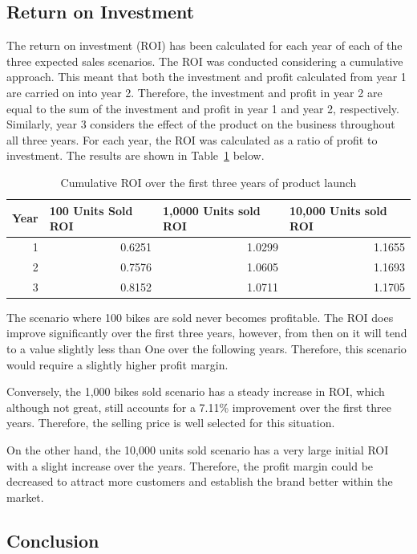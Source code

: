 \documentclass[a4paper,11pt]{article}
\begin{document}
\subsection{Return on Investment}
\label{sec:roi}

The return on investment (ROI) has been calculated for each year of each of the three expected sales scenarios. The ROI was conducted considering a cumulative approach. This meant that both the investment and profit calculated from year 1 are carried on into year 2. Therefore, the investment and profit in year 2 are equal to the sum of the investment and profit in year 1 and year 2, respectively. Similarly, year 3 considers the effect of the product on the business throughout all three years. For each year, the ROI was calculated as a ratio of profit to investment.  The results are shown in Table~\ref{tab:ROI} below. 

\begin{table}[!ht]
	\centering
	\caption{Cumulative ROI over the first three years of product launch}
	\begin{tabular}{r r r r}
		\hline
		\multicolumn{1}{l}{Year}&\multicolumn{1}{l}{100 Units Sold ROI}&\multicolumn{1}{l}{1,0000 Units sold ROI}&\multicolumn{1}{l}{10,000 Units sold ROI}\\ \hline
		1&0.6251&1.0299&1.1655\\
		2&0.7576&1.0605&1.1693\\
		3&0.8152&1.0711&1.1705\\
	\end{tabular}
	\label{tab:ROI}
\end{table}

The scenario where 100 bikes are sold never becomes profitable. The ROI does improve significantly over the first three years, however, from then on it will tend to a value slightly less than One over the following years. Therefore, this scenario would require a slightly higher profit margin. 

Conversely, the 1,000 bikes sold scenario has a steady increase in ROI, which although not great, still accounts for a 7.11\% improvement over the first three years. Therefore, the selling price is well selected for this situation. 

On the other hand, the 10,000 units sold scenario has a very large initial ROI with a slight increase over the years. Therefore, the profit margin could be decreased to attract more customers and establish the brand better within the market.

\subsection{Conclusion}
\end{document}
